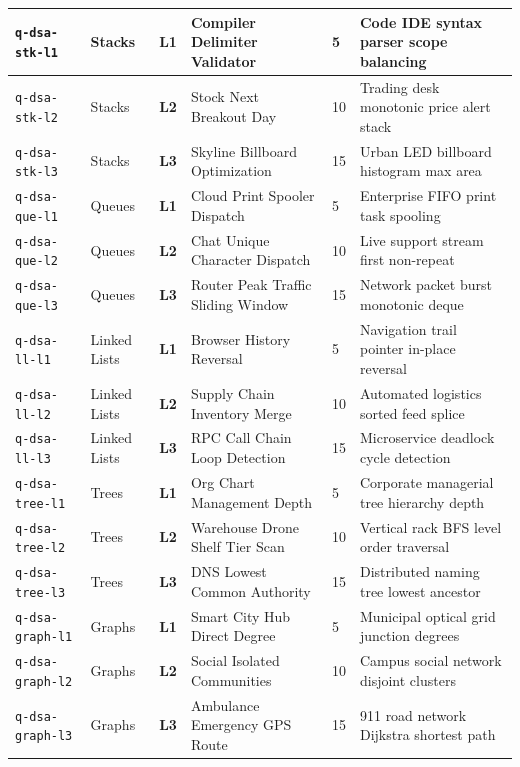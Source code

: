 \documentclass[12pt, a4paper]{report}
\begin{document}
\begin{center}
\begin{longtable}{|L{2.2cm}|L{2.0cm}|C{0.9cm}|L{3.8cm}|C{0.9cm}|L{6.2cm}|}
\texttt{q-dsa-stk-l1} & Stacks & \textbf{L1} & Compiler Delimiter Validator & 5 & Code IDE syntax parser scope balancing \\
\hline
\texttt{q-dsa-stk-l2} & Stacks & \textbf{L2} & Stock Next Breakout Day & 10 & Trading desk monotonic price alert stack \\
\hline
{}
\texttt{q-dsa-stk-l3} & Stacks & \textbf{L3} & Skyline Billboard Optimization & 15 & Urban LED billboard histogram max area \\
\hline

\texttt{q-dsa-que-l1} & Queues & \textbf{L1} & Cloud Print Spooler Dispatch & 5 & Enterprise FIFO print task spooling \\
\hline
{}
\texttt{q-dsa-que-l2} & Queues & \textbf{L2} & Chat Unique Character Dispatch & 10 & Live support stream first non-repeat \\
\hline
\texttt{q-dsa-que-l3} & Queues & \textbf{L3} & Router Peak Traffic Sliding Window & 15 & Network packet burst monotonic deque \\
\hline

\texttt{q-dsa-ll-l1} & Linked Lists & \textbf{L1} & Browser History Reversal & 5 & Navigation trail pointer in-place reversal \\
\hline
\texttt{q-dsa-ll-l2} & Linked Lists & \textbf{L2} & Supply Chain Inventory Merge & 10 & Automated logistics sorted feed splice \\
\hline
{}
\texttt{q-dsa-ll-l3} & Linked Lists & \textbf{L3} & RPC Call Chain Loop Detection & 15 & Microservice deadlock cycle detection \\
\hline

\texttt{q-dsa-tree-l1} & Trees & \textbf{L1} & Org Chart Management Depth & 5 & Corporate managerial tree hierarchy depth \\
\hline
{}
\texttt{q-dsa-tree-l2} & Trees & \textbf{L2} & Warehouse Drone Shelf Tier Scan & 10 & Vertical rack BFS level order traversal \\
\hline
\texttt{q-dsa-tree-l3} & Trees & \textbf{L3} & DNS Lowest Common Authority & 15 & Distributed naming tree lowest ancestor \\
\hline

\texttt{q-dsa-graph-l1} & Graphs & \textbf{L1} & Smart City Hub Direct Degree & 5 & Municipal optical grid junction degrees \\
\hline
\texttt{q-dsa-graph-l2} & Graphs & \textbf{L2} & Social Isolated Communities & 10 & Campus social network disjoint clusters \\
\hline
{}
\texttt{q-dsa-graph-l3} & Graphs & \textbf{L3} & Ambulance Emergency GPS Route & 15 & 911 road network Dijkstra shortest path \\
\hline


\end{longtable}
\end{center}
\end{document}
